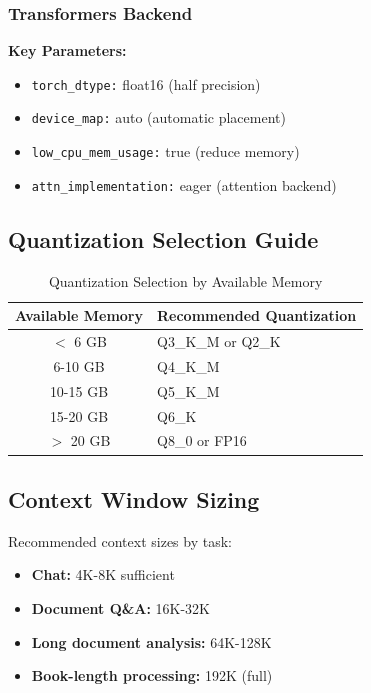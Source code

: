 \subsubsection{Transformers Backend}

\textbf{Key Parameters:}
\begin{itemize}
    \item \texttt{torch\_dtype:} float16 (half precision)
    \item \texttt{device\_map:} auto (automatic placement)
    \item \texttt{low\_cpu\_mem\_usage:} true (reduce memory)
    \item \texttt{attn\_implementation:} eager (attention backend)
\end{itemize}

\subsection{Quantization Selection Guide}

\begin{table}[h]
\centering
\caption{Quantization Selection by Available Memory}
\label{tab:quant_selection}
\begin{tabular}{cl}
\toprule
\textbf{Available Memory} & \textbf{Recommended Quantization} \\
\midrule
$<$ 6 GB & Q3\_K\_M or Q2\_K \\
6-10 GB & Q4\_K\_M \\
10-15 GB & Q5\_K\_M \\
15-20 GB & Q6\_K \\
$>$ 20 GB & Q8\_0 or FP16 \\
\bottomrule
\end{tabular}
\end{table}

\subsection{Context Window Sizing}

Recommended context sizes by task:

\begin{itemize}
    \item \textbf{Chat:} 4K-8K sufficient
    \item \textbf{Document Q\&A:} 16K-32K
    \item \textbf{Long document analysis:} 64K-128K
    \item \textbf{Book-length processing:} 192K (full)
\end{itemize}

